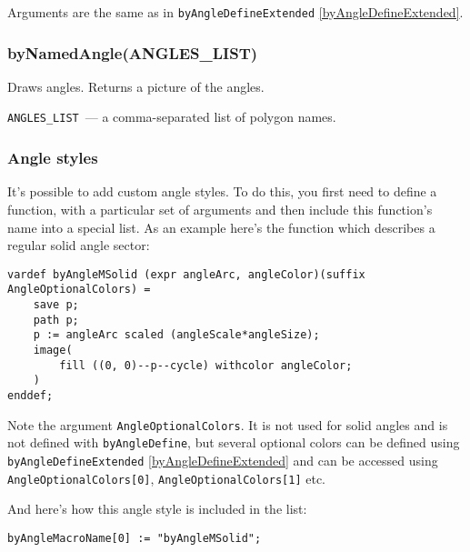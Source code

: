 	Arguments are the same as in \texttt{byAngleDefineExtended} \ref{byAngleDefineExtended}.

\subsubsection{byNamedAngle(ANGLES\_LIST)}\label{byNamedAngle}
	
	Draws angles. Returns a picture of the angles.
	
	\texttt{ANGLES\_LIST}~— a comma-separated list of polygon names.


\subsubsection{Angle styles}\label{AngleStyles}

	It's possible to add custom angle styles. To do this, you first need to define a function, with a particular set of arguments and then include this function's name into a special list. As an example here's the function which describes a regular solid angle sector:
	
\begin{lstlisting}
vardef byAngleMSolid (expr angleArc, angleColor)(suffix AngleOptionalColors) =
    save p;
    path p;
    p := angleArc scaled (angleScale*angleSize);
    image(
        fill ((0, 0)--p--cycle) withcolor angleColor;
    )
enddef;
\end{lstlisting}

	Note the argument \texttt{AngleOptionalColors}. It is not used for solid angles and is not defined with \texttt{byAngleDefine}, but several optional colors can be defined using \texttt{byAngleDefineExtended} \ref{byAngleDefineExtended} and can be accessed using \texttt{AngleOptionalColors[0]}, \texttt{AngleOptionalColors[1]} etc.

	And here's how this angle style is included in the list:

\begin{lstlisting}
byAngleMacroName[0] := "byAngleMSolid";
\end{lstlisting}


